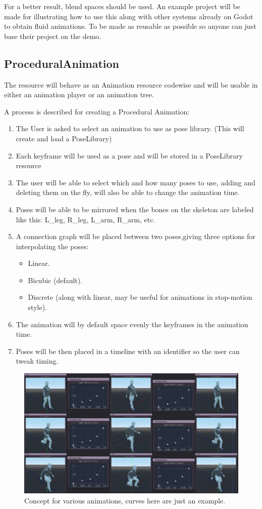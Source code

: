 \documentclass[]{article}
\begin{document}
For a better result, blend spaces should be used. 
An example project will be made for illustrating how to use this along with other systems already on Godot to obtain fluid animations. To be made as reusable as possible so anyone can just base their project on the demo. 

\subsection{ProceduralAnimation}
The resource will behave as an Animation resource codewise and will be usable in either an animation player or an animation tree.

A process is described for creating a Procedural Animation:
\begin{enumerate}
\item The User is asked to select an animation to use as pose library. (This will create and load a PoseLibrary)
\item Each keyframe will be used as a pose and will be stored in a PoseLibrary resource
\item The user will be able to select which and how many poses to use, adding and deleting them on the fly, will also be able to change the animation time. 
\item Poses will be able to be mirrored when the bones on the skeleton are labeled like this: L\_leg, R\_leg, L\_arm, R\_arm, etc. 
\item A connection graph will be placed between two poses,giving three options for interpolating the poses: 
\begin{itemize}
\item Linear.
\item Bicubic (default).
\item Discrete (along with linear, may be useful for animations in stop-motion style).
\end{itemize}

\item The animation will by default space evenly the keyframes in the animation time.
\item Poses will be then placed in a timeline with an identifier so the user can tweak timing.
\end{enumerate}

\begin{figure}[H]
	\centering
	\includegraphics[width=1\textwidth]{mockup}
	\caption{Concept for various animations, curves here are just an example.}
\end{figure}
\end{document}
